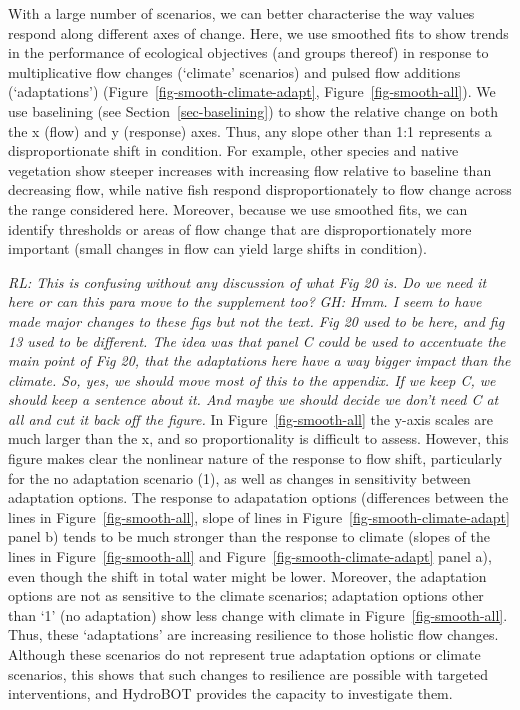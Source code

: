 \documentclass[
  number]{elsarticle}
\begin{document}
With a large number of scenarios, we can better characterise the way
values respond along different axes of change. Here, we use smoothed
fits to show trends in the performance of ecological objectives (and
groups thereof) in response to multiplicative flow changes (`climate'
scenarios) and pulsed flow additions (`adaptations')
(Figure~\ref{fig-smooth-climate-adapt}, Figure~\ref{fig-smooth-all}). We
use baselining (see Section~\ref{sec-baselining}) to show the relative
change on both the x (flow) and y (response) axes. Thus, any slope other
than 1:1 represents a disproportionate shift in condition. For example,
other species and native vegetation show steeper increases with
increasing flow relative to baseline than decreasing flow, while native
fish respond disproportionately to flow change across the range
considered here. Moreover, because we use smoothed fits, we can identify
thresholds or areas of flow change that are disproportionately more
important (small changes in flow can yield large shifts in condition).

\emph{RL: This is confusing without any discussion of what Fig 20 is. Do
we need it here or can this para move to the supplement too?} \emph{GH:
Hmm. I seem to have made major changes to these figs but not the text.
Fig 20 used to be here, and fig 13 used to be different. The idea was
that panel C could be used to accentuate the main point of Fig 20, that
the adaptations here have a way bigger impact than the climate. So, yes,
we should move most of this to the appendix. If we keep C, we should
keep a sentence about it. And maybe we should decide we don't need C at
all and cut it back off the figure.} In Figure~\ref{fig-smooth-all} the
y-axis scales are much larger than the x, and so proportionality is
difficult to assess. However, this figure makes clear the nonlinear
nature of the response to flow shift, particularly for the no adaptation
scenario (1), as well as changes in sensitivity between adaptation
options. The response to adapatation options (differences between the
lines in Figure~\ref{fig-smooth-all}, slope of lines in
Figure~\ref{fig-smooth-climate-adapt} panel b) tends to be much stronger
than the response to climate (slopes of the lines in
Figure~\ref{fig-smooth-all} and Figure~\ref{fig-smooth-climate-adapt}
panel a), even though the shift in total water might be lower. Moreover,
the adaptation options are not as sensitive to the climate scenarios;
adaptation options other than `1' (no adaptation) show less change with
climate in Figure~\ref{fig-smooth-all}. Thus, these `adaptations' are
increasing resilience to those holistic flow changes. Although these
scenarios do not represent true adaptation options or climate scenarios,
this shows that such changes to resilience are possible with targeted
interventions, and HydroBOT provides the capacity to investigate them.
\end{document}
